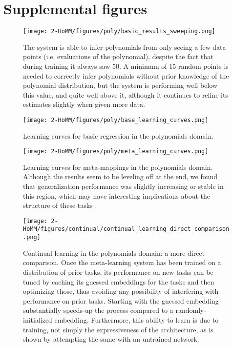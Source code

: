 \section{Supplemental figures} \label{app_supp_figures}
\begin{figure}[H]
\centering
\texttt{[image: 2-HoMM/figures/poly/basic\_results\_sweeping.png]}
\caption{The system is able to infer polynomials from only seeing a few data points (i.e. evaluations of the polynomial), despite the fact that during training it always saw 50. A minimum of 15 random points is needed to correctly infer polynomials without prior knowledge of the polynomial distribution, but the system is performing well below this value, and quite well above it, although it continues to refine its estimates slightly when given more data.}
\label{supp_poly_sweep_results}
\end{figure}

\begin{figure}[H]
\centering
\texttt{[image: 2-HoMM/figures/poly/base\_learning\_curves.png]}
\caption{Learning curves for basic regression in the polynomials domain.}
\label{supp_poly_basic_learning_curves}
\end{figure}

\begin{figure}[H]
\centering
\texttt{[image: 2-HoMM/figures/poly/meta\_learning\_curves.png]}
\caption{Learning curves for meta-mappings in the polynomials domain. Although the results seem to be leveling off at the end, we found that generalization performance was slightly increasing or stable in this region, which may have interesting implications about the structure of these tasks \citep{Lampinen2019}.}
\label{supp_poly_meta_learning_curves}
\end{figure}

\begin{figure}[H]
\centering
\texttt{[image: 2-HoMM/figures/continual/continual\_learning\_direct\_comparison.png]}
\caption{Continual learning in the polynomials domain: a more direct comparison. Once the meta-learning system has been trained on a distribution of prior tasks, its performance on new tasks can be tuned by caching its guessed embeddings for the tasks and then optimizing those, thus avoiding any possibility of interfering with performance on prior tasks. Starting with the guessed embedding substantially speeds-up the process compared to a randomly-initialized embedding. Furthermore, this ability to learn is due to training, not simply the expressiveness of the architecture, as is shown by attempting the same with an untrained network.}
\label{supp_poly_continual_results}
\end{figure}

